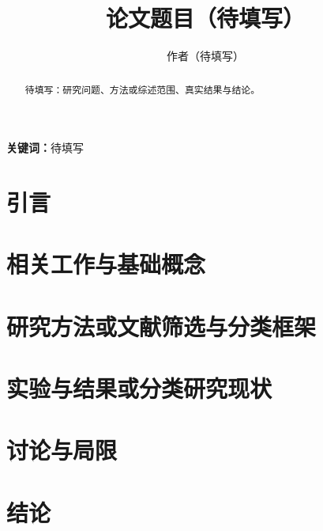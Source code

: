 \documentclass[UTF8,a4paper,zihao=-4]{ctexart}
\title{论文题目（待填写）}
\author{作者（待填写）}
\date{}
\begin{document}
\maketitle
\begin{abstract}
待填写：研究问题、方法或综述范围、真实结果与结论。
\end{abstract}
\noindent\textbf{关键词：}待填写
\section{引言}
\section{相关工作与基础概念}
\section{研究方法或文献筛选与分类框架}
\section{实验与结果或分类研究现状}
\section{讨论与局限}
\section{结论}


\end{document}
